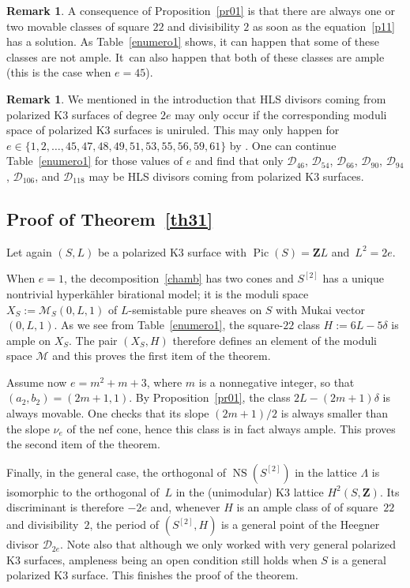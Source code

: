 \documentclass[JEP,XML,SOM,Unicode, NoEqCountersInSection,NoFloatCountersInSection]{cedram}
\let\mathcal\mathscr
\theoremstyle{definition}
\newtheorem{rema}[lemm]{Remark}
\newcommand\Z{{\mathbf Z}}
\newcommand\cD{\mathcal{D}}
\newcommand\cM{\mathcal{M}}
\let\Ld L
\DeclareMathOperator{\NS}{NS}
\DeclareMathOperator{\Pic}{Pic}
\newcommand\hilbS{S^{[2]}}
\newcommand\hk{hyperkähler\xspace}
\begin{document}
\begin{rema}
A consequence of Proposition~\ref{pr01} is that there are always one or two movable classes of square $22$ and divisibility $2$ as soon as the equation~\eqref{p11} has a solution. As Table~\ref{enumero1} shows, it can happen that some of these classes are not ample.
It~can also happen that both of these classes are ample (this is the case when $e=45$).
\end{rema}

\begin{rema}\label{other}
We mentioned in the introduction that HLS divisors coming from polarized K3 surfaces of degree $2e$ may only occur if the corresponding moduli space of polarized K3 surfaces is uniruled. This may only happen for $e\in\{1,2,\dots,45,47,48,49,51,53,55,56,59,61\} $ by \cite{ghs}. One can continue Table~\ref{enumero1} for those values of $e$ and find that only $\cD_{46}$, $
\cD_{54}$, $\cD_{66}$, $\cD_{90}$, $\cD_{94}$, $\cD_{106}$, and $\cD_{118}$ may be HLS divisors coming from polarized K3 surfaces.
\end{rema}

\subsection{Proof of Theorem~\ref{th31}}

Let again $(S,L)$ be a polarized K3 surface with $\Pic(S)=\Z L$ and~$L^2=2e$.

When $e=1$, the decomposition~\eqref{chamb} has two cones and $ \hilbS$ has a unique nontrivial \hk birational model; it is the
moduli space $X_S:=\cM_S(0,L,1)$ of $L$-semistable pure sheaves on $S$ with Mukai vector $(0,L,1)$. As we see from Table~\ref{enumero1}, the square-$22$ class $H:=6L-5\delta$ is ample on $X_S$. The pair $(X_S,H)$ therefore defines an element of the moduli space $\cM$ and this proves the first item of the theorem.

Assume now $e=m^2+m+3$, where
$m$ is a nonnegative integer, so that $(a_2,b_2)=(2m+1,1)$. By Proposition~\ref{pr01}, the class $2\Ld-(2m+1)\delta$ is always movable. One checks that its slope $(2m+1)/2$ is always smaller than the slope $\nu_e$ of the nef cone, hence this class is in fact always ample. This proves the second item of the theorem.

Finally, in
the general case, the orthogonal of $\NS(\hilbS) $ in the lattice $\Lambda$ is isomorphic to the orthogonal of~$L$ in the (unimodular) K3 lattice $H^2(S,\Z)$. Its discriminant is therefore $-2e$ and, whenever $H$ is an ample class of of square~$22$ and divisibility~$2$, the period of $(\hilbS,H)$ is a general point of the Heegner divisor $\cD_{2e}$. Note also that although we only worked with very general polarized K3 surfaces, ampleness being an open condition still holds when $S$ is a general polarized K3 surface. This finishes the proof of the theorem.
\end{document}
